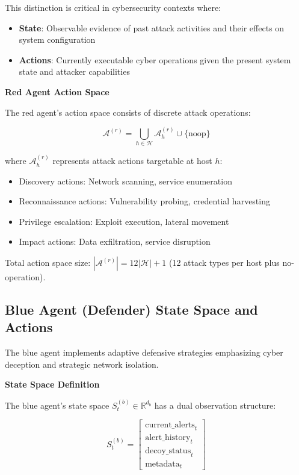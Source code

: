 \documentclass[12pt]{article}
\theoremstyle{definition}
\theoremstyle{plain}
\begin{document}
This distinction is critical in cybersecurity contexts where:
\begin{itemize}
    \item \textbf{State}: Observable evidence of past attack activities and their effects on system configuration
    \item \textbf{Actions}: Currently executable cyber operations given the present system state and attacker capabilities
\end{itemize}

\textbf{Red Agent Action Space}

The red agent's action space consists of discrete attack operations:

\begin{equation}
\mathcal{A}^{(r)} = \bigcup_{h \in \mathcal{H}} \mathcal{A}^{(r)}_h \cup \{\text{noop}\}
\end{equation}

where $\mathcal{A}^{(r)}_h$ represents attack actions targetable at host $h$:
\begin{itemize}
    \item Discovery actions: Network scanning, service enumeration
    \item Reconnaissance actions: Vulnerability probing, credential harvesting  
    \item Privilege escalation: Exploit execution, lateral movement
    \item Impact actions: Data exfiltration, service disruption
\end{itemize}

Total action space size: $|\mathcal{A}^{(r)}| = 12|\mathcal{H}| + 1$ (12 attack types per host plus no-operation).

\subsection{Blue Agent (Defender) State Space and Actions}

The blue agent implements adaptive defensive strategies emphasizing cyber deception and strategic network isolation.

\textbf{State Space Definition}

The blue agent's state space $S^{(b)}_t \in \mathbb{R}^{d_b}$ has a dual observation structure:

\begin{equation}
S^{(b)}_t = \begin{bmatrix}
\text{current\_alerts}_t \\
\text{alert\_history}_t \\
\text{decoy\_status}_t \\
\text{metadata}_t
\end{bmatrix}
\end{equation}
\end{document}
